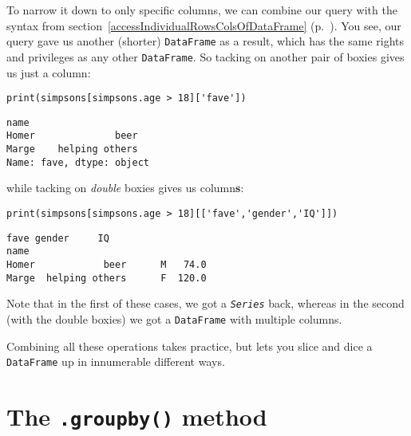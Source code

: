 To narrow it down to only specific columns, we can combine our query with the
syntax from section~\ref{accessIndividualRowsColsOfDataFrame}
(p.~\pageref{accessIndividualRowsColsOfDataFrame}). You see, our query gave us
another (shorter) \texttt{DataFrame} as a result, which has the same rights and
privileges as any other \texttt{DataFrame}. So tacking on another pair of
boxies gives us just a column:

\begin{Verbatim}[fontsize=\small,samepage=true,frame=single,framesep=3mm]
print(simpsons[simpsons.age > 18]['fave'])
\end{Verbatim}
\vspace{-.2in}

\begin{Verbatim}[fontsize=\small,samepage=true,frame=leftline,framesep=5mm,framerule=1mm]
name
Homer              beer
Marge    helping others
Name: fave, dtype: object
\end{Verbatim}

while tacking on \textit{double} boxies gives us column\textbf{s}:

\begin{Verbatim}[fontsize=\footnotesize,samepage=true,frame=single,framesep=3mm]
print(simpsons[simpsons.age > 18][['fave','gender','IQ']])
\end{Verbatim}
\vspace{-.2in}

\begin{Verbatim}[fontsize=\small,samepage=true,frame=leftline,framesep=5mm,framerule=1mm]
                 fave gender     IQ
name                               
Homer            beer      M   74.0
Marge  helping others      F  120.0
\end{Verbatim}

Note that in the first of these cases, we got a \textit{\texttt{Series}} back,
whereas in the second (with the double boxies) we got a \texttt{DataFrame} with
multiple columns.

Combining all these operations takes practice, but lets you slice and dice a
\texttt{DataFrame} up in innumerable different ways.

\section{The \texttt{.groupby()} method}

\label{groupby}

